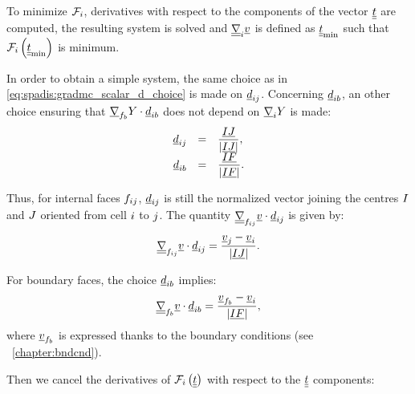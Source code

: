 To minimize $\mathcal{F}_\celli$, derivatives with respect to the components of the
vector $\variat  $ are computed, the resulting system is solved and $\gradt_\celli \variav$ is defined
as $\variat_{\min}$ such that $\mathcal{F}_\celli \left( \variat_{\min}\right)$ is minimum.

In order to obtain a simple system, the same choice as in \eqref{eq:spadis:gradmc_scalar_d_choice} is made on $\vect{d}_\ij$.
Concerning $\vect{d}_\ib$, an other choice ensuring that $\grad_{\fib} \varia   \cdot \vect{d}_\ib $ does not
depend on $\grad_{\celli} \varia $ is made:
%
\begin{equation}\label{eq:spadis:gradmv_scalar_d_choice}
\begin{array}{r c l}
\vect{d}_\ij &=& \dfrac{\vect{\centi \centj}}{\norm{\vect{\centi \centj}}}, \\
\vect{d}_\ib &=& \dfrac{\vect{\centi \centf}}{\norm{\vect{\centi \centf}}} .
\end{array}
\end{equation}

Thus, for internal faces $\fij$, $\vect{d}_\ij$ is still the normalized vector joining
the centres $\centi$ and $\centj$ oriented from cell $\celli$ to $\cellj$.
The quantity  $\gradt_{\fij} \variav   \cdot \vect{d}_\ij$ is given by:
\begin{equation}
\gradt_{\fij} \variav   \cdot \vect{d}_\ij =\dfrac{\variav_\cellj - \variav_\celli }{\norm{\vect{\centi \centj}}}.
\end{equation}

For boundary faces, the choice $\vect{d}_\ib$ implies:
\begin{equation}
\gradt_{\fib} \variav   \cdot \vect{d}_\ib =\dfrac{\variav_\fib - \variav_\celli }{\norm{\vect{\centi \centf}}},
\end{equation}
where $\variav_\fib$ is expressed thanks to the boundary conditions (see \chaptername~\ref{chapter:bndcnd}).

Then we cancel the derivatives of
$\mathcal{F}_\celli \left( \variat \right)$ with respect to the $ \variat$ components:


